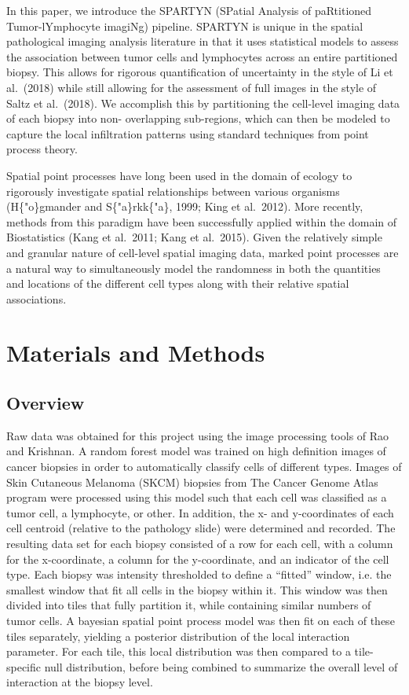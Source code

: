 \documentclass[
]{book}
\begin{document}
In this paper, we introduce the SPARTYN (SPatial Analysis of
paRtitioned Tumor-lYmphocyte imagiNg) pipeline. SPARTYN is unique
in the spatial pathological imaging analysis literature in that it
uses statistical models to assess the association between tumor
cells and lymphocytes across an entire partitioned biopsy. This
allows for rigorous quantification of uncertainty in the style of Li
et al.~(2018) while still allowing for the assessment of full images
in the style of Saltz et al.~(2018). We accomplish this by
partitioning the cell-level imaging data of each biopsy into non-
overlapping sub-regions, which can then be modeled to capture the
local infiltration patterns using standard techniques from
point process theory.

Spatial point processes have long been used in the domain of
ecology to rigorously investigate spatial relationships between
various organisms (H\{"o\}gmander and S\{"a\}rkk\{"a\}, 1999; King et
al.~2012). More recently, methods from this paradigm have been
successfully applied within the domain of Biostatistics (Kang
et al.~2011; Kang et al.~2015). Given the relatively simple and
granular nature of cell-level spatial imaging data, marked point
processes are a natural way to simultaneously model the randomness
in both the quantities and locations of the different cell types
along with their relative spatial associations.

\hypertarget{materials-and-methods}{%
\chapter{Materials and Methods}\label{materials-and-methods}}

\hypertarget{overview}{%
\section{Overview}\label{overview}}

Raw data was obtained for this project using the image
processing tools of Rao and Krishnan. A random forest model was
trained on high definition images of cancer biopsies in order
to automatically classify cells of different types. Images of
Skin Cutaneous Melanoma (SKCM) biopsies from The Cancer Genome Atlas
program were processed using this model such that
each cell was classified as a tumor cell, a lymphocyte, or
other. In addition, the x- and y-coordinates of each cell
centroid (relative to the pathology slide) were determined and
recorded. The resulting data set for each biopsy consisted of a
row for each cell, with a column for the x-coordinate, a column
for the y-coordinate, and an indicator of the cell type. Each
biopsy was intensity thresholded to define a ``fitted'' window, i.e.
the smallest window that fit all cells in the biopsy within it.
This window was then divided into tiles that fully partition it,
while containing similar numbers of tumor cells. A bayesian spatial
point process model was then fit on each of these tiles separately,
yielding a posterior distribution of the local interaction parameter.
For each tile, this local distribution was then compared to a
tile-specific null distribution, before being combined to summarize
the overall level of interaction at the biopsy level.
\end{document}
